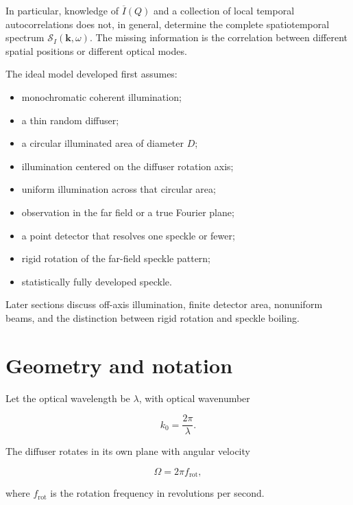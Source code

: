 \documentclass[11pt]{article}
\newcommand{\SII}{\mathcal{S}_{I}}
\newcommand{\kopt}{k_0}
\newcommand{\kvec}{\mathbf{k}}
\begin{document}
In particular, knowledge of $\overline{I}(Q)$ and a collection of local
temporal autocorrelations does not, in general, determine the complete
spatiotemporal spectrum $\SII(\kvec,\omega)$. The missing information is the
correlation between different spatial positions or different optical modes.

The ideal model developed first assumes:

\begin{itemize}
    \item monochromatic coherent illumination;
    \item a thin random diffuser;
    \item a circular illuminated area of diameter $D$;
    \item illumination centered on the diffuser rotation axis;
    \item uniform illumination across that circular area;
    \item observation in the far field or a true Fourier plane;
    \item a point detector that resolves one speckle or fewer;
    \item rigid rotation of the far-field speckle pattern;
    \item statistically fully developed speckle.
\end{itemize}

Later sections discuss off-axis illumination, finite detector area, nonuniform
beams, and the distinction between rigid rotation and speckle boiling.

\section{Geometry and notation}

Let the optical wavelength be $\lambda$, with optical wavenumber

\begin{equation}
    \kopt = \frac{2\pi}{\lambda}.
\end{equation}

The diffuser rotates in its own plane with angular velocity

\begin{equation}
    \Omega = 2\pi f_{\mathrm{rot}},
\end{equation}

where $f_{\mathrm{rot}}$ is the rotation frequency in revolutions per second.
\end{document}
